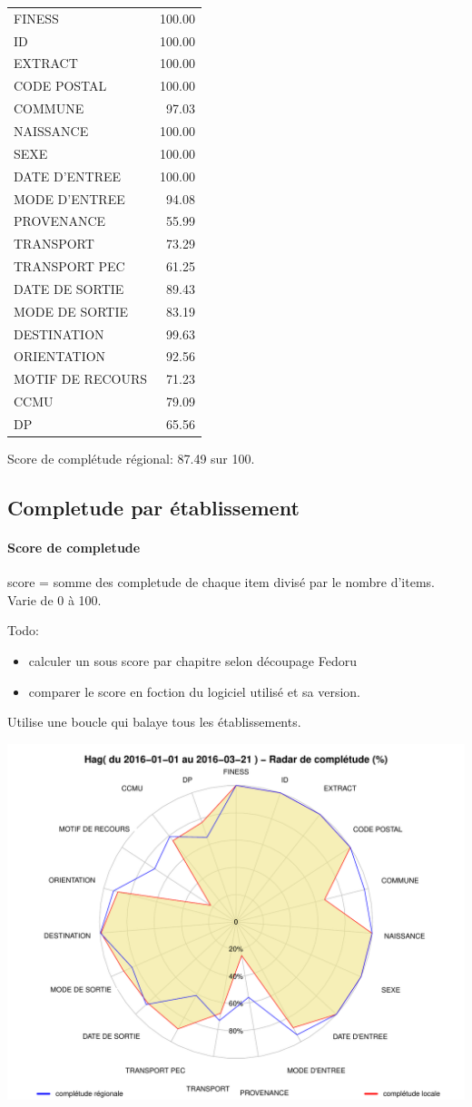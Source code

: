 \documentclass[]{article}
\providecommand{\tightlist}{%
  \setlength{\itemsep}{0pt}\setlength{\parskip}{0pt}}
\let\oldparagraph\paragraph
\renewcommand{\paragraph}[1]{\oldparagraph{#1}\mbox{}}
\begin{document}
\begin{longtable}[c]{@{}lr@{}}
\toprule
FINESS & 100.00\tabularnewline
ID & 100.00\tabularnewline
EXTRACT & 100.00\tabularnewline
CODE POSTAL & 100.00\tabularnewline
COMMUNE & 97.03\tabularnewline
NAISSANCE & 100.00\tabularnewline
SEXE & 100.00\tabularnewline
DATE D'ENTREE & 100.00\tabularnewline
MODE D'ENTREE & 94.08\tabularnewline
PROVENANCE & 55.99\tabularnewline
TRANSPORT & 73.29\tabularnewline
TRANSPORT PEC & 61.25\tabularnewline
DATE DE SORTIE & 89.43\tabularnewline
MODE DE SORTIE & 83.19\tabularnewline
DESTINATION & 99.63\tabularnewline
ORIENTATION & 92.56\tabularnewline
MOTIF DE RECOURS & 71.23\tabularnewline
CCMU & 79.09\tabularnewline
DP & 65.56\tabularnewline
\bottomrule
\end{longtable}

Score de complétude régional: 87.49 sur 100.

\subsection{Completude par
établissement}\label{completude-par-etablissement}

\paragraph{Score de completude}\label{score-de-completude}

score = somme des completude de chaque item divisé par le nombre
d'items. Varie de 0 à 100.

Todo:

\begin{itemize}
\tightlist
\item
  calculer un sous score par chapitre selon découpage Fedoru
\item
  comparer le score en foction du logiciel utilisé et sa version.
\end{itemize}

Utilise une boucle qui balaye tous les établissements.

\includegraphics{completude_files/figure-latex/finess-1.pdf}
\end{document}
